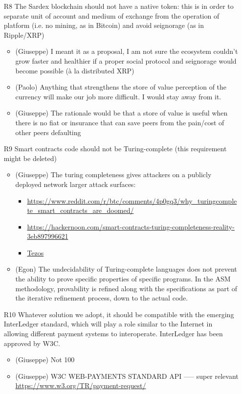 \begin{itemize}
\item[R8] The Sardex blockchain should not have a native token: this is in order to separate unit of
account and medium of exchange from the operation of platform (i.e. no mining, as in Bitcoin)
and avoid seignorage (as in Ripple/XRP)
\begin{itemize}
	\item (Giuseppe) I meant it as a proposal, I am not sure the ecosystem couldn’t grow faster and healthier if a proper social protocol and seignorage would become possible (à la distributed XRP)
	\item (Paolo) Anything that strengthens the store of value perception of the currency will make our job more difficult. I would stay away from it.
	\item (Giuseppe) The rationale would be that a store of value is useful when there is no fiat or insurance that can save peers from the pain/cost of other peers defaulting
\end{itemize}


\item[R9] Smart contracts code should not be Turing-complete (this requirement might be deleted)
\begin{itemize}
	\item (Giuseppe) The turing completeness gives attackers on a publicly deployed network larger attack surfaces:
	\begin{itemize}
		\item \url{https://www.reddit.com/r/btc/comments/4p0gq3/why_turingcomplete_smart_contracts_are_doomed/}
		\item \url{https://hackernoon.com/smart-contracts-turing-completeness-reality-3eb897996621}
		\item \href{https://www.quora.com/How-is-Tezos-different-from-Ethereum}{Tezos}
	\end{itemize}

	\item (Egon) The undecidability of Turing-complete languages does not prevent the ability to prove specific properties of specific programs. In the ASM methodology, provability is refined along with the specifications as part of the iterative refinement process, down to the actual code.
\end{itemize}


\item[R10] Whatever solution we adopt, it should be compatible with the emerging InterLedger
standard, which will play a role similar to the Internet in allowing different payment
systems to interoperate. InterLedger has been approved by W3C.
\begin{itemize}
	\item (Giuseppe) Not 100%
	\item (Giuseppe) W3C WEB-PAYMENTS STANDARD API ----- super relevant \url{https://www.w3.org/TR/payment-request/}
\end{itemize}



\end{itemize}
